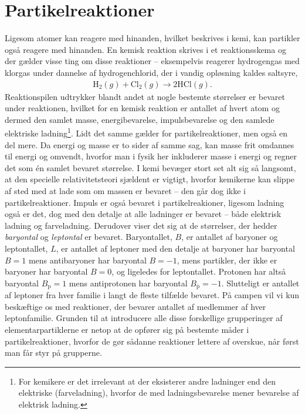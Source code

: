 \section{Partikelreaktioner} \label{sec:partikelreaktioner}
Ligesom atomer kan reagere med hinanden, hvilket beskrives i kemi, kan partikler også reagere med hinanden. En kemisk reaktion skrives i et reaktionsskema og der gælder visse ting om disse reaktioner -- eksempelvis reagerer hydrogengas med klorgas under dannelse af hydrogenchlorid, der i vandig opløsning kaldes saltsyre,
%
\begin{align}
    \mathrm{H}_2(g) + \mathrm{Cl}_2(g) \longrightarrow 2 \mathrm{HCl}(g).
\end{align}
%
Reaktionspilen udtrykker blandt andet at nogle bestemte størrelser er bevaret under reaktionen, hvilket for en kemisk reaktion er antallet af hvert atom og dermed den samlet masse, energibevarelse, impulsbevarelse og den samlede elektriske ladning\footnote{For kemikere er det irrelevant at der eksisterer andre ladninger end den elektriske (farveladning), hvorfor de med ladningsbevarelse mener bevarelse af elektrisk ladning.}. Lidt det samme gælder for partikelreaktioner, men også en del mere. Da energi og masse er to sider af samme sag, kan masse frit omdannes til energi og omvendt, hvorfor man i fysik her inkluderer masse i energi og regner det som én samlet bevaret størrelse. I kemi bevæger stort set alt sig så langsomt, at den specielle relativitetsteori sjældent er vigtigt, hvorfor kemikerne kan slippe af sted med at lade som om massen er bevaret -- den går dog ikke i partikelreaktioner. Impuls er også bevaret i partikelreakioner, ligesom ladning også er det, dog med den detalje at alle ladninger er bevaret -- både elektrisk ladning og farveladning. Derudover viser det sig at de størrelser, der hedder \textit{baryontal} og \textit{leptontal} er bevaret. Baryontallet, $B$, er antallet af baryoner og leptontallet, $L$, er antallet af leptoner med den detalje at baryoner har baryontal $B=1$ mens antibaryoner har baryontal $B=-1$, mens partikler, der ikke er baryoner har baryontal $B=0$, og ligeledes for leptontallet. Protonen har altså baryontal $B_\mathrm{p} = 1$ mens antiprotonen har baryontal $B_{\bar{\mathrm{p}}} = -1$. Slutteligt er antallet af leptoner fra hver familie i langt de fleste tilfælde bevaret. På campen vil vi kun beskæftige os med reaktioner, der bevarer antallet af medlemmer af hver leptonfamilie. Grunden til at introducere alle disse forskellige grupperinger af elementarpartiklerne er netop at de opfører sig på bestemte måder i partikelreaktioner, hvorfor de gør sådanne reaktioner lettere af overskue, når først man får styr på grupperne. \\

